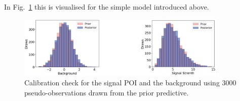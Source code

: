 \noindent In Fig.~\ref{calibrationPlot} this is visualised for the simple model introduced above.
    \begin{figure} %
        \centering
        \includegraphics[width=10cm]{figures/calibration.png}
        \centering
        \caption{Calibration check for the signal POI and the background using 3000 pseudo-observations drawn from the prior predictive.}
        \label{calibrationPlot}
    \end{figure}

